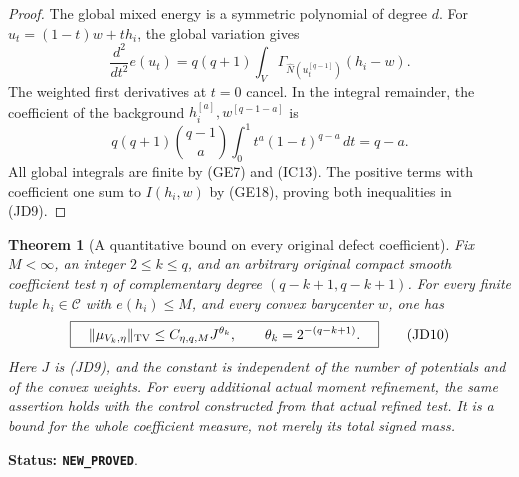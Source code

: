 \documentclass[11pt,a4paper]{article}
\numberwithin{equation}{section}
\newtheorem{theorem}{Theorem}[section]
\theoremstyle{definition}
\theoremstyle{remark}
\begin{document}
\begin{proof}
The global mixed energy is a symmetric polynomial of degree $d$.
For $u_t=(1-t)w+th_i$, the global variation gives
\[
 \frac{d^2}{dt^2}e(u_t)=q(q+1)
             \int_V\Gamma_{\widehat N(u_t^{[q-1]})}(h_i-w).
\]
The weighted first derivatives at $t=0$ cancel.  In the integral
remainder, the coefficient of the background
$h_i^{[a]},w^{[q-1-a]}$ is
\[
 q(q+1)\binom{q-1}{a}\int_0^1t^a(1-t)^{q-a}\,dt=q-a.
\]
All global integrals are finite by (GE7) and (IC13).  The positive
terms with coefficient one sum to $I(h_i,w)$ by (GE18), proving
both inequalities in (JD9).
\end{proof}

\begin{theorem}[A quantitative bound on every original defect coefficient]
\label{thm:r12-defect-coefficient-bound}
Fix $M<\infty$, an integer $2\leq k\leq q$, and an arbitrary
original compact smooth coefficient test $\eta$ of complementary
degree $(q-k+1,q-k+1)$.  For every finite tuple $h_i\in\mathcal C$
with $e(h_i)\leq M$, and every convex barycenter $w$, one has
\[
 \boxed{\quad
 \|\mu_{V_k,\eta}\|_{\rm TV}
          \leq C_{\eta,q,M} J^{\theta_k},\qquad
       \theta_k=2^{-(q-k+1)}.
 \quad}
 \tag{JD10}
\]
Here $J$ is (JD9), and the constant is independent of the number
of potentials and of the convex weights.  For every additional
actual moment refinement, the same assertion holds with the
control constructed from that actual refined test.  It is a bound
for the whole coefficient measure, not merely its total signed mass.
\end{theorem}

\noindent\textbf{Status: \texttt{NEW\_PROVED}}.
\end{document}
